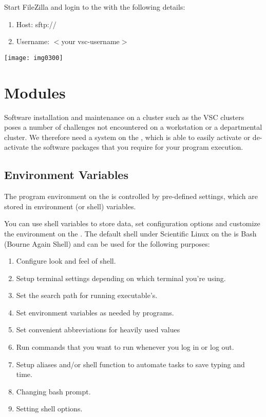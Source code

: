   Start FileZilla and login to the \hpc with the following details:

  \begin{enumerate}
  \item  Host: sftp://\loginnode
  \item  Username:  $<$your vsc-username$>$
  \end{enumerate}

  \texttt{[image: img0300]}
\fi

\section{Modules}

Software installation and maintenance on a \hpc cluster such as the VSC
clusters poses a number of challenges not encountered on a workstation or a
departmental cluster. We therefore need a system on the \hpc, which is able
to easily activate or de-activate the software packages that you require for
your program execution.

\subsection{Environment Variables}

The program environment on the \hpc is controlled by pre-defined settings,
which are stored in environment (or shell) variables.

You can use shell variables to store data, set configuration options and
customize the environment on the \hpc. The default shell under Scientific
Linux on the \hpc is Bash (Bourne Again Shell) and can be used for the
following purposes:

\begin{enumerate}
\item  Configure look and feel of shell.
\item  Setup terminal settings depending on which terminal you're using.
\item  Set the search path for running executable's.
\item  Set environment variables as needed by programs.
\item  Set convenient abbreviations for heavily used values
\item  Run commands that you want to run whenever you log in or log out.
\item  Setup aliases and/or shell function to automate tasks to save typing and time.
\item  Changing bash prompt.
\item  Setting shell options.
\end{enumerate}

